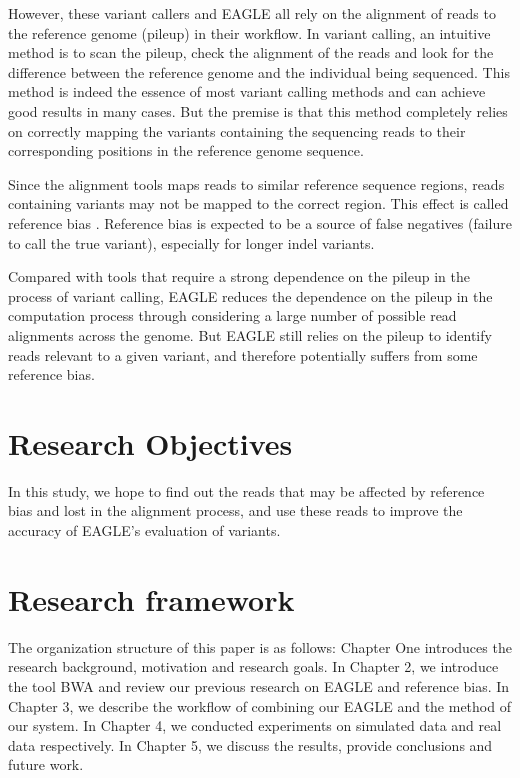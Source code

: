However, these variant callers and EAGLE all rely on the alignment of reads to the reference genome (pileup) in their workflow. In variant calling, an intuitive method is to scan the pileup, check the alignment of the reads and look for the difference between the reference genome and the individual being sequenced. This method is indeed the essence of most variant calling methods and can achieve good results in many cases. But the premise is that this method completely relies on correctly mapping the variants containing the sequencing reads to their corresponding positions in the reference genome sequence. 

Since the alignment tools maps reads to similar reference sequence regions, reads containing variants may not be mapped to the correct region. This effect is called reference bias \cite{sousa2013understanding}. Reference bias is expected to be a source of false negatives (failure to call the true variant), especially for longer indel variants.

Compared with tools that require a strong dependence on the pileup in the process of variant calling, EAGLE reduces the dependence on the pileup in the computation process through considering a large number of possible read alignments across the genome.  But EAGLE still relies on the pileup to identify reads relevant to a given variant, and therefore potentially suffers from some reference bias.

\section{Research Objectives}		
In this study, we hope to find out the reads that may be affected by reference bias and lost in the alignment process, and use these reads to improve the accuracy of EAGLE's evaluation of variants.

\section{Research framework}
The organization structure of this paper is as follows: Chapter One introduces the research background, motivation and research goals. In Chapter 2, we introduce the tool BWA and review our previous research on EAGLE and reference bias. In Chapter 3, we describe the workflow of combining our EAGLE and the method of our system. In Chapter 4, we conducted experiments on simulated data and real data respectively. In Chapter 5, we discuss the results, provide conclusions and future work.
